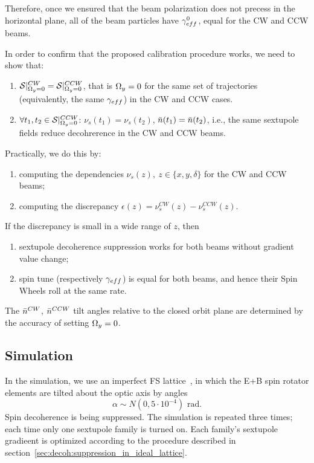 Therefore, once we ensured that the beam polarization does not precess in the horizontal plane,
all of the beam particles have $\g*^0$, equal for the CW and CCW beams.


In order to confirm that the proposed calibration procedure works, we need to show that:
\begin{enumerate}
\item $\Stab*^{CW} = \Stab*^{CCW}$, that is $\Omega_y=0$ for the same set of trajectories (equivalently,
  the same $\g*$) in the CW and CCW cases.
\item $\forall t_1,t_2\in\Stab*^{CCW}$: $\nu_s(t_1) = \nu_s(t_2)$, $\bar n(t_1) = \bar n(t_2)$, i.e., the same
  sextupole fields reduce decohrerence in the CW and CCW beams.
\end{enumerate}

Practically, we do this by:
\begin{enumerate}
\item computing the dependencies $\nu_s(z),~z\in\{x,y,\delta\}$ for the CW and CCW beams;
\item computing the discrepancy $\epsilon(z) = \nu_s^{CW}(z) - \nu_s^{CCW}(z)$.
\end{enumerate}

If the discrepancy is small in a wide range of $z$, then
\begin{enumerate}
\item sextupole decoherence suppression works for both beams without gradient value change;
\item spin tune (respectively $\g*$) is equal for both beams, and hence their Spin Wheels roll at the
  same rate.
\end{enumerate}

The $\bar n^{CW}$, $\bar n^{CCW}$ tilt angles relative to the closed orbit plane are determined by the accuracy of
setting $\Omega_y=0$.

\subsection{Simulation}
In the simulation, we use an imperfect FS lattice~\cite{Senichev:Lattices}, in which the E+B
spin rotator elements are tilted about the optic axis by angles 
\[
\alpha\sim N(0, 5\cdot 10^{-4})\text{~rad}.
\]
Spin decoherence is being suppressed. The simulation is repeated three times;
each time only one sextupole family is turned on.
Each family's sextupole gradieent is optimized according to the procedure
described in section~\ref{sec:decoh:suppression_in_ideal_lattice}.


